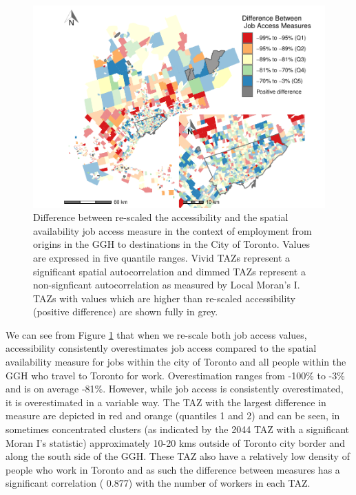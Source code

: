 \documentclass[]{elsarticle} %
\begin{document}
\begin{figure}
\includegraphics[width=1\linewidth]{Spatial-Availability_files/figure-latex/plot-local-i-Toronto-1} \caption{\label{fig:plot-local-i-Toronto}Difference between re-scaled the accessibility and the spatial availability job access measure in the context of employment from origins in the GGH to destinations in the City of Toronto. Values are expressed in five quantile ranges. Vivid TAZs represent a significant spatial autocorrelation and dimmed TAZs represent a non-signficant autocorrelation as measured by Local Moran's I. TAZs with values which are higher than re-scaled accessibility (positive difference) are shown fully in grey.}\label{fig:plot-local-i-Toronto}
\end{figure}

We can see from Figure \ref{fig:plot-local-i-Toronto} that when we
re-scale both job access values, accessibility consistently
overestimates job access compared to the spatial availability measure
for jobs within the city of Toronto and all people within the GGH who
travel to Toronto for work. Overestimation ranges from -100\% to -3\%
and is on average -81\%. However, while job access is consistently
overestimated, it is overestimated in a variable way. The TAZ with the
largest difference in measure are depicted in red and orange (quantiles
1 and 2) and can be seen, in sometimes concentrated clusters (as
indicated by the 2044 TAZ with a significant Moran I's statistic)
approximately 10-20 kms outside of Toronto city border and along the
south side of the GGH. These TAZ also have a relatively low density of
people who work in Toronto and as such the difference between measures
has a significant correlation ( 0.877) with the number of workers in
each TAZ.
\end{document}

